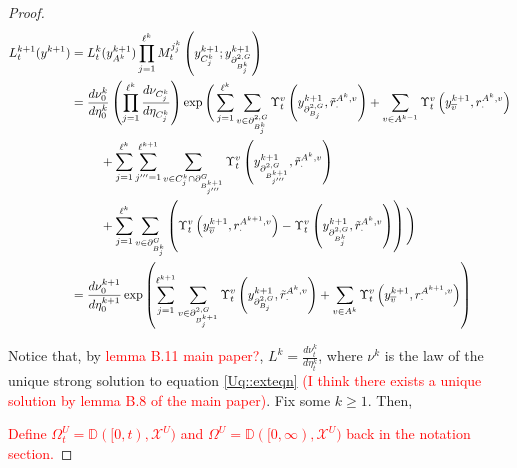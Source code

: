 \documentclass[12pt]{article}
\newcommand{\mb}{\mathbb}
\newcommand{\mc}{\mathcal}
\newcommand{\ov}{\overline}
\newcommand{\tr}{\textcolor{red}}
\newcommand{\cad}{\mb{D}}							%
\newcommand{\sta}{\mc{X}}							%
\newcommand{\gneigh}[2]{\partial^{#1}_{#2}}			%
\newcommand{\dgneigh}[2]{\partial^{2,#1}_{#2}}		%
\newcommand{\cl}[1]{\ov{#1}}						%
\newcommand{\indx}[1]{^{#1}}						%
\newcommand{\rate}{r}								%
\newcommand{\xg}{y}									%
\newcommand{\vind}[1]{_{#1}}						%
\newcommand{\vpara}[1]{^{#1}}						%
\newcommand{\stpara}[1]{_{#1}}						%
\newcommand{\tpara}[1]{_{#1}}						%
\newcommand{\gvpara}[2]{^{#1,#2}}					%
\newcommand{\psize}{\ell}							%
\newcommand{\brate}{\alt{\rate}}					%
\newcommand{\alt}[1]{\tilde{#1}}					%
\newcommand{\mm}{\nu}								%
\newcommand{\mmm}{\eta}								%
\newcommand{\ds}{\Upsilon}							%
\newcommand{\dense}{L}								%
\newcommand{\mdense}{M}								%
\newcommand{\jpara}[1]{^{#1}}						%
\begin{document}
\begin{proof}
\begin{align*}
\dense\indx{k+1}\tpara{t}(\xg\indx{k+1}) &= \dense\indx{k}\tpara{t}(\xg\indx{k+1}\vind{A\indx{k}})\prod_{j=1}^{\psize\indx{k}}\mdense\jpara{j\indx{k}_j}\tpara{t}\left(\xg\indx{k+1}\vind{C_j\indx{k}};\xg\indx{k+1}\vind{\dgneigh{G}{B\indx{k}_j}}\right)\\
&= \frac{d\mm\indx{k}\tpara{0}}{d\mmm\indx{k}\tpara{0}}\left(\prod_{j=1}^{\psize\indx{k}}\frac{d\mm\vind{C_j\indx{k}}}{d\mmm\vind{C_j\indx{k}}}\right)\exp\Bigg(\sum_{j=1}^{\psize\indx{k}}\sum_{v\in \dgneigh{G}{B_j\indx{k}}} \ds\vpara{v}\tpara{t}\left(\xg\indx{k+1}\vind{\dgneigh{G}{B_j}},\brate\gvpara{A\indx{k}}{v}\stpara{\cdot}\right) + \sum_{v \in A\indx{k-1}} \ds\vpara{v}\tpara{t}\left(\xg\indx{k+1}\vind{\cl{v}},\rate\gvpara{A\indx{k}}{v}\stpara{\cdot}\right)\\
&\hspace{24 pt} + \sum_{j=1}^{\psize\indx{k}}\sum_{j'''=1}^{\psize\indx{k+1}}\sum_{v \in C_j\indx{k}\cap\gneigh{G}{B_{j'''}\indx{k+1}}}\ds\vpara{v}\tpara{t}\left(\xg\indx{k+1}\vind{\dgneigh{G}{B_{j'''}\indx{k+1}}},\brate\gvpara{A\indx{k}}{v}\stpara{\cdot}\right)\\
&\hspace{24pt} + \sum_{j=1}^{\psize\indx{k}}\sum_{v \in \gneigh{G}{B_j\indx{k}}}\left(\ds\vpara{v}\tpara{t}\left(\xg\indx{k+1}\vind{\cl{v}},\rate\gvpara{A\indx{k+1}}{v}\stpara{\cdot}\right) - \ds\vpara{v}\tpara{t}\left(\xg\indx{k+1}\vind{\dgneigh{G}{B_j\indx{k}}},\brate\gvpara{A\indx{k}}{v}\stpara{\cdot}\right)\right)\Bigg)\\
&= \frac{d\mm\indx{k+1}\tpara{0}}{d\mmm\indx{k+1}\tpara{0}}\exp\left(\sum_{j=1}^{\psize\indx{k+1}}\sum_{v\in \dgneigh{G}{B_j\indx{k+1}}} \ds\vpara{v}\tpara{t}\left(\xg\indx{k+1}\vind{\dgneigh{G}{B_j}},\brate\gvpara{A\indx{k}}{v}\stpara{\cdot}\right) + \sum_{v \in A\indx{k}}\ds\vpara{v}\tpara{t}\left(\xg\vind{\cl{v}}\indx{k+1},\rate\gvpara{A\indx{k+1}}{v}\stpara{\cdot}\right)\right)
\end{align*}

Notice that, by \tr{lemma B.11 main paper?}, \(\dense\indx{k} = \frac{d\mm\indx{k}\tpara{t}}{d\mmm\indx{k}\tpara{t}}\), where \(\mm\indx{k}\) is the law of the unique strong solution to equation \eqref{Uq::exteqn} \tr{(I think there exists a unique solution by lemma B.8 of the main paper)}. Fix some \(k \geq 1\). Then,

\tr{Define \(\Omega\vpara{U}\tpara{t} = \cad([0,t),\sta^U)\) and \(\Omega\vpara{U} = \cad([0,\infty),\sta^U)\) back in the notation section.}


\end{proof}
\end{document}
